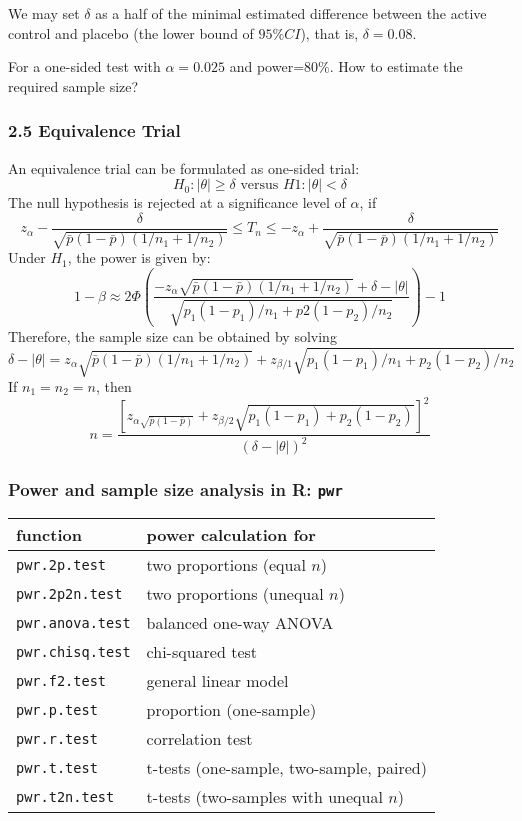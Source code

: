 \documentclass[table,10pt]{beamer}
\begin{document}
\begin{CJK*}{UTF8}{gbsn}
\begin{frame}[t]
We may set $\delta$ as a half of the minimal estimated difference 
between the active control and placebo (the lower bound of $95\%CI$), 
that is, $\delta=0.08$.

For a one-sided test with $\alpha=0.025$ and power=$80\%$. How to 
estimate the required sample size?
\end{frame}


\begin{frame}[t]
\frametitle{2.5 Equivalence Trial}
An equivalence trial can be formulated as one-sided trial:
$$
H_0: |\theta| \ge \delta \mbox{ versus } H1: |\theta| < \delta
$$
The null hypothesis is rejected at a significance level of $\alpha$, if
$$
z_{\alpha} - \frac{\delta}{\sqrt{\bar{p}(1-\bar{p})(1/n_1+1/n_2)}} \le T_n \le -z_{\alpha} + \frac{\delta}{\sqrt{\bar{p}(1-\bar{p})(1/n_1+1/n_2)}}
$$
Under $H_1$, the power is given by:
$$
1-\beta \approx 2\Phi\left( \frac{-z_{\alpha}\sqrt{\bar{p}(1-\bar{p})(1/n_1 + 1/n_2)} + \delta - |\theta|}{\sqrt{p_1(1-p_1)/n_1+p2(1-p_2)/n_2}}\right) - 1
$$
Therefore, the sample size can be obtained by solving
$$
\delta - |\theta| = z_{\alpha} \sqrt{\bar{p}(1-\bar{p})(1/n_1+1/n_2)} + z_{\beta/1} \sqrt{p_1(1-p_1)/n_1 + p_2(1-p_2)/n_2}
$$
If $n_1 = n_2 = n$, then
$$
n = \frac{\left[ z_{\alpha \sqrt{\bar{p}(1-\bar{p})}} + z_{\beta/2} \sqrt{p_1(1-p_1)+p_2(1-p_2)}\right]^2}{(\delta - |\theta|)^2}
$$
\end{frame}


\begin{frame}[t]
\frametitle{Power and sample size analysis in R: \texttt{pwr}}
\begin{table}
\begin{tabular}{ll}
\textbf{function} & \textbf{power calculation for}\\
\hline
\texttt{pwr.2p.test} & two proportions (equal $n$)\\
\texttt{pwr.2p2n.test} & two proportions (unequal $n$)\\
\texttt{pwr.anova.test} & balanced one-way ANOVA\\
\texttt{pwr.chisq.test} & chi-squared test\\
\texttt{pwr.f2.test} & general linear model\\
\texttt{pwr.p.test} & proportion (one-sample)\\
\texttt{pwr.r.test} & correlation test\\
\texttt{pwr.t.test} & t-tests (one-sample, two-sample, paired)\\
\texttt{pwr.t2n.test} & t-tests (two-samples with unequal $n$)\\
\hline
\end{tabular}
\end{table}
\end{frame}



\end{CJK*}
\end{document}
